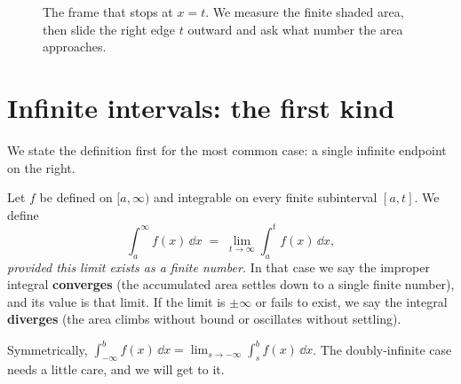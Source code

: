\begin{figure}[H]
\centering
{}
\caption{The frame that stops at $x=t$. We measure the finite shaded area, then slide
the right edge $t$ outward and ask what number the area approaches.}
\label{ch25:fig-frame}
\end{figure}

\section{Infinite intervals: the first kind}
\label{ch25:first-kind}

We state the definition first for the most common case: a single infinite
endpoint on the right.

\begin{definition}[Improper integral over $[a,\infty)$]
\label{ch25:def-first-kind}
Let $f$ be defined on $[a,\infty)$ and integrable on every finite subinterval
$[a,t]$. We define
\[
  \int_a^{\infty} f(x)\,\dd x
  \;=\; \lim_{t\to\infty} \int_a^{t} f(x)\,\dd x,
\]
\emph{provided this limit exists as a finite number.} In that case we say the
improper integral \textbf{converges} (the accumulated area settles down to a
single finite number), and its value is that limit. If the limit is
$\pm\infty$ or fails to exist, we say the integral \textbf{diverges} (the area
climbs without bound or oscillates without settling).
\end{definition}

Symmetrically, $\displaystyle\int_{-\infty}^{b} f(x)\,\dd x = \lim_{s\to-\infty}
\int_s^{b} f(x)\,\dd x$. The doubly-infinite case needs a little care, and we will
get to it.

